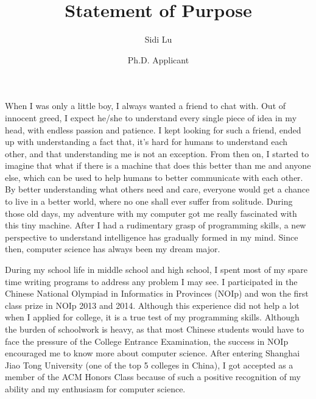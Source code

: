 \documentclass{article}
\title{Statement of Purpose}
\author{Sidi Lu}
\date{Ph.D. Applicant}
\begin{document}
      \maketitle%
      \thispagestyle{empty}
      \vspace{35pt}
    
      When I was only a little boy, I always wanted a friend to chat with. Out of innocent greed, I expect he/she to understand every single piece of idea in my head, with endless passion and patience. I kept looking for such a friend, ended up with understanding a fact that, it's hard for humans to understand each other, and that understanding me is not an exception. From then on, I started to imagine that what if there is a machine that does this better than me and anyone else, which can be used to help humans to better communicate with each other. By better understanding what others need and care, everyone would get a chance to live in a better world, where no one shall ever suffer from solitude. During those old days, my adventure with my computer got me really fascinated with this tiny machine. After I had a rudimentary grasp of programming skills, a new perspective to understand intelligence has gradually formed in my mind. Since then, computer science has always been my dream major. 
      
      During my school life in middle school and high school, I spent most of my spare time writing programs to address any problem I may see. I participated in the Chinese National Olympiad in Informatics in Provinces (NOIp) and won the first class prize in NOIp 2013 and 2014. Although this experience did not help a lot when I applied for college, it is a true test of my programming skills. Although the burden of schoolwork is heavy, as that most Chinese students would have to face the pressure of the College Entrance Examination, the success in NOIp encouraged me to know more about computer science. After entering Shanghai Jiao Tong University (one of the top 5 colleges in China), I got accepted as a member of the ACM Honors Class because of such a positive recognition of my ability and my enthusiasm for computer science. 

      
\end{document}
